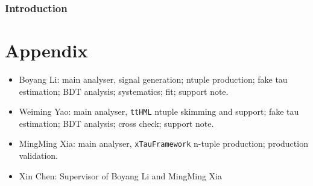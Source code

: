 \documentclass[UKenglish,texlive=2020]{\ATLASLATEXPATH atlasdoc}
\begin{document}
\maketitle

\tableofcontents


\tableofcontents
\newpage

\linenumbers
\section{Introduction}









\clearpage
\appendix
\part*{Appendix}

%
%
%
%
%
%
%
%
\clearpage

\printbibliography
%
%

\clearpage
{}

\begin{itemize}
\item Boyang Li: main analyser, signal generation; ntuple production; fake tau estimation; BDT analysis; systematics; fit; support note.
\item Weiming Yao: main analyser, \texttt{ttHML} ntuple skimming and support; fake tau estimation; BDT analysis; cross check; support note.
\item MingMing Xia: main analyser, \texttt{xTauFramework} n-tuple production; production validation.
\item Xin Chen: Supervisor of Boyang Li and MingMing Xia
\end{itemize}
\end{document}
